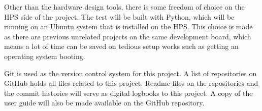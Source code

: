 Other than the hardware design tools, there is some freedom of choice on the HPS side of the project.
The test will be built with Python, which will be running on an Ubuntu system that is installed on the HPS.
This choice is made as there are previous unrelated projects on the same development board, which means a lot of time can be saved on tedious setup works such as getting an operating system booting.

Git is used as the version control system for this project.
A list of repositories on GitHub holds all files related to this project.
Readme files on the repositories and the commit histories will serve as digital logbooks to this project.
A copy of the user guide will also be made available on the GitHub repository.